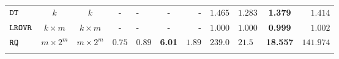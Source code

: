 {\begin {table}[t]
\begin{center}
{\begin{tabular}{|| >{\tiny}l || c | c || c | l | c | r || c | l | c | r || }
         \hhline{||-||---||-||--||----||}
        $\mathtt{DT}$ & $k$ &  $k$ & -  & - & - & - & $ 1.465$  & $ 1.283$ & \textbf{1.379 } & {$1.414$}   \\
         \hhline{||-||---||-||--||----||}
        $\mathtt{LROVR}$  & $k \times m$ &  $ k \times m $  & -  & - & - & -  &  $ 1.000  $  &  $ 1.000 $ & {\textbf{ 0.999}} & $ 1.002 $  \\
        \hhline{||-||---||-||--||----||}
        $\mathtt{RQ}$~\cite{Jamieson2015TheAO} & $ m \times 2^m $ & $  m \times 2^m $  & $0.75$  & $0.89$ & \textbf{6.01} & $1.89$ & $239.0$   & $21.5$ & {\textbf{18.557}} & $141.974$   \\
        \hhline{||-||---||-||--||----||}

\end{tabular}}
\end{center}
\end{table}}
